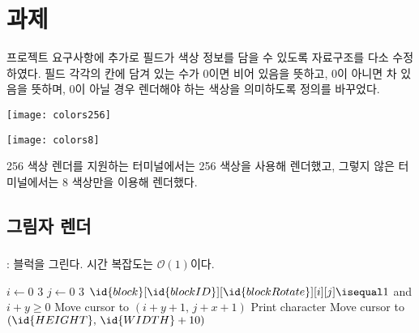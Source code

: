 \inputminted[xleftmargin=\parindent,linenos,firstline=303,lastline=326]{c}{inc-sources/tetris-week09-experiment.c}

\section{과제}

프로젝트 요구사항에 추가로 필드가 색상 정보를 담을 수 있도록 자료구조를 다소 수정하였다.
필드 각각의 칸에 담겨 있는 수가 0이면 비어 있음을 뜻하고, 0이 아니면 차 있음을 뜻하며, 0이 아닐 경우 렌더해야 하는 색상을 의미하도록 정의를 바꾸었다.

\begin{multicols}{2}
    \begin{Figure}
		\texttt{[image: colors256]}
        \label{fig:colors256}
	\end{Figure}
	\columnbreak
    \begin{Figure}
		\texttt{[image: colors8]}
        \label{fig:colors8}
	\end{Figure}
\end{multicols}

256 색상 렌더를 지원하는 터미널에서는 256 색상을 사용해 렌더했고, 그렇지 않은 터미널에서는 8 색상만을 이용해 렌더했다.

\subsection{그림자 렌더}

\subsubsection{}: 블럭을 그린다. 시간 복잡도는 $\mathcal{O}\left(1\right)$이다.

\begin{codebox}
\li \For $i \gets 0$ \To $3$
\li \Do
        \For $j \gets 0$ \To $3$
\li     \Do
            \If $\id{block}[\id{blockID}][\id{blockRotate}][i][j] \isequal 1$ and $i + y \geq 0$
\li         \Then
                Move cursor to $(i + y + 1, \, j + x + 1)$
\li             Print character
            \End
        \End
    \End
\li Move cursor to $(\id{HEIGHT}, \, \id{WIDTH} + 10)$
\end{codebox}

\inputminted[xleftmargin=\parindent,linenos,firstline=190,lastline=210]{c}{inc-sources/tetris-week09-homework.c}

